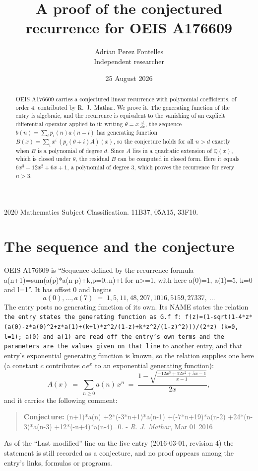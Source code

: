 \documentclass[11pt,a4paper]{article}
\title{A proof of the conjectured recurrence for OEIS A176609}
\author{Adrian Perez Fontelles\\ \small Independent researcher}
\date{25 August 2026}
\theoremstyle{plain}
\theoremstyle{definition}
\begin{document}
\maketitle

\begin{abstract}
OEIS A176609 carries a conjectured linear recurrence with polynomial coefficients, of
order 4, contributed by R.~J.~Mathar. We prove it. The generating function of the
entry is algebraic, and the recurrence is equivalent to the vanishing of an explicit
differential operator applied to it: writing $\theta=x\,\frac{d}{dx}$, the sequence
$b(n)=\sum_{i}p_{i}(n)a(n-i)$ has generating function
$B(x)=\sum_{i}x^{i}\,(p_{i}(\theta+i)A)(x)$, so the conjecture holds for all $n>d$ exactly
when $B$ is a polynomial of degree $d$. Since $A$ lies in a quadratic extension of
$\mathbb{Q}(x)$, which is closed under $\theta$, the residual $B$ can be computed in
closed form. Here it equals $6 x^{3} - 12 x^{2} + 6 x + 1$, a polynomial of degree $3$, which proves
the recurrence for every $n>3$.
\end{abstract}

\noindent\small 2020 Mathematics Subject Classification. 11B37, 05A15, 33F10.\normalsize

\section{The sequence and the conjecture}

OEIS A176609 is ``Sequence defined by the recurrence formula a(n+1)=sum(a(p)*a(n-p)+k,p=0..n)+l for n>=1, with here a(0)=1, a(1)=5, k=0 and l=1''. It has offset $0$ and begins
\[
a(0),\dots,a(7)\;=\;1, 5, 11, 48, 207, 1016, 5159, 27337,\ \dots
\]
The entry posts no generating function of its own. Its NAME states the
relation \texttt{the entry states the generating function as G.f f: f(z)=(1-sqrt(1-4*z*(a(0)-z*a(0)\textasciicircum{}2+z*a(1)+(k+l)*z\textasciicircum{}2/(1-z)+k*z\textasciicircum{}2/(1-z)\textasciicircum{}2)))/(2*z) (k=0, l=1); a(0) and a(1) are read off the entry's own terms and the parameters are the values given on that line} to another entry, and that entry's exponential generating
function is known, so the relation supplies one here (a constant $c$ contributes
$c\,e^{x}$ to an exponential generating function):
\begin{equation}\label{eq:gf}
A(x)\;=\;\sum_{n\ge 0} a(n)\,x^{n}\;=\;\frac{1 - \sqrt{\frac{- 12 x^{3} + 12 x^{2} + 5 x - 1}{x - 1}}}{2 x} ,
\end{equation}
and it carries the following comment:
\begin{quote}\small
\textbf{Conjecture:} (n+1)*a(n) +2*(-3*n+1)*a(n-1) +(-7*n+19)*a(n-2) +24*(n-3)*a(n-3) +12*(-n+4)*a(n-4)=0. - \emph{R. J. Mathar}, Mar 01 2016
\end{quote}
As of the ``Last modified'' line on the live entry (2016-03-01, revision 4) the
statement is still recorded as a conjecture, and no proof appears among the entry's links,
formulas or programs.
\end{document}
